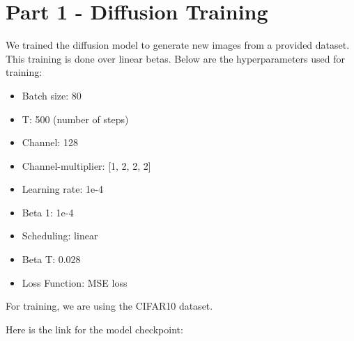 \documentclass[conference]{IEEEtran}
\begin{document}




\maketitle




\IEEEpeerreviewmaketitle

\section{Part 1 - Diffusion Training}
We trained the diffusion model to generate new images from a provided dataset. This training is done over linear betas.
Below are the hyperparameters used for training:
\begin{itemize}
  \item Batch size: 80
  \item T: 500 (number of steps)
  \item Channel: 128
  \item Channel-multiplier: [1, 2, 2, 2]
  \item Learning rate: 1e-4
  \item Beta 1: 1e-4
  \item Scheduling: linear
  \item Beta T: 0.028
  \item Loss Function: MSE loss
\end{itemize}

For training, we are using the CIFAR10 dataset. 


Here is the link for the model checkpoint: 
\end{document}
